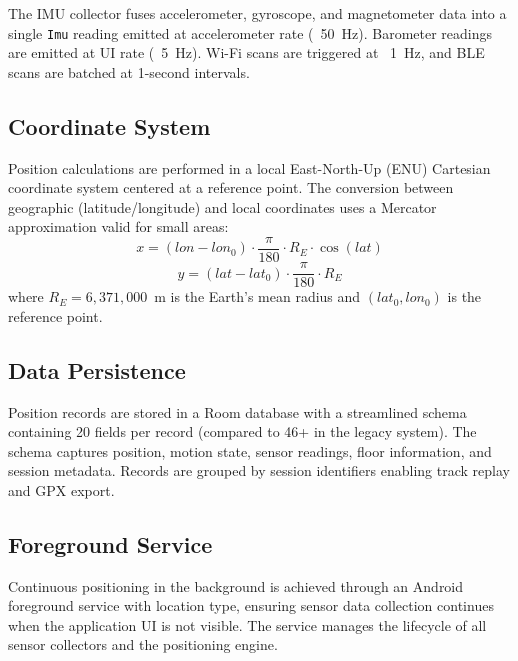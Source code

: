 \documentclass[journal,twocolumn]{IEEEtran}
\begin{document}
The IMU collector fuses accelerometer, gyroscope, and magnetometer data into a single \texttt{Imu} reading emitted at accelerometer rate (~50~Hz). Barometer readings are emitted at UI rate (~5~Hz). Wi-Fi scans are triggered at ~1~Hz, and BLE scans are batched at 1-second intervals.

\subsection{Coordinate System}

Position calculations are performed in a local East-North-Up (ENU) Cartesian coordinate system centered at a reference point. The conversion between geographic (latitude/longitude) and local coordinates uses a Mercator approximation valid for small areas:
\begin{equation}
    x = (lon - lon_0) \cdot \frac{\pi}{180} \cdot R_E \cdot \cos(lat)
    \label{eq:lon_to_m}
\end{equation}
\begin{equation}
    y = (lat - lat_0) \cdot \frac{\pi}{180} \cdot R_E
    \label{eq:lat_to_m}
\end{equation}
where $R_E = 6{,}371{,}000$~m is the Earth's mean radius and $(lat_0, lon_0)$ is the reference point.

\subsection{Data Persistence}

Position records are stored in a Room database with a streamlined schema containing 20 fields per record (compared to 46+ in the legacy system). The schema captures position, motion state, sensor readings, floor information, and session metadata. Records are grouped by session identifiers enabling track replay and GPX export.

\subsection{Foreground Service}

Continuous positioning in the background is achieved through an Android foreground service with location type, ensuring sensor data collection continues when the application UI is not visible. The service manages the lifecycle of all sensor collectors and the positioning engine.

\end{document}
